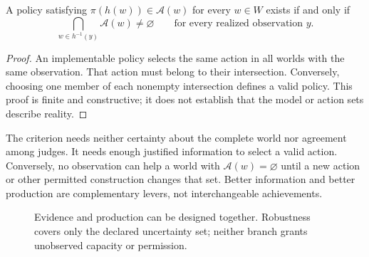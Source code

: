 \begin{proposition}
\label{prop:decision}
A policy satisfying $\pi(h(w))\in\mathcal A(w)$ for every $w\in W$ exists if and only if
\begin{equation}
\bigcap_{w\in h^{-1}(y)}\mathcal A(w)\ne\varnothing
\qquad\text{for every realized observation }y.
\label{eq:intersection}
\end{equation}
\end{proposition}
\begin{proof}
An implementable policy selects the same action in all worlds with the same observation. That action must belong to their intersection. Conversely, choosing one member of each nonempty intersection defines a valid policy. This proof is finite and constructive; it does not establish that the model or action sets describe reality.
\end{proof}

The criterion needs neither certainty about the complete world nor agreement among judges. It needs enough justified information to select a valid action. Conversely, no observation can help a world with $\mathcal A(w)=\varnothing$ until a new action or other permitted construction changes that set. Better information and better production are complementary levers, not interchangeable achievements.

\begin{figure}[H]
\centering
{}
\caption{Evidence and production can be designed together. Robustness covers only the declared uncertainty set; neither branch grants unobserved capacity or permission.}
\label{fig:twolevers}
\end{figure}


